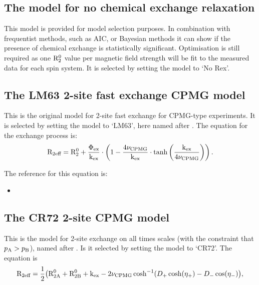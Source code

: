 
\subsection{The model for no chemical exchange relaxation}
\label{sect: dispersion: No Rex model}

This model is provided for model selection purposes.  In combination with frequentist methods, such as AIC, or Bayesian methods it can show if the presence of chemical exchange is statistically significant.  Optimisation is still required as one $\mathrm{R}_2^0$ value per magnetic field strength will be fit to the measured data for each spin system.  It is selected by setting the model to `No Rex'.




\subsection{The LM63 2-site fast exchange CPMG model}
\label{sect: dispersion: LM63 model}

This is the original model for 2-site fast exchange for CPMG-type experiments.  It is selected by setting the model to `LM63', here named after \citet{LuzMeiboom63}.  The equation for the exchange process is:
\begin{equation}
    \mathrm{R}_{2\textrm{eff}} = \mathrm{R}_2^0 + \frac{\Phi_\textrm{ex}}{\textrm{k}_\textrm{ex}} \cdot \left( 1 - \frac{4\nu_\textrm{CPMG}}{\textrm{k}_\textrm{ex}} \cdot \tanh \left( \frac{\textrm{k}_\textrm{ex}}{4\nu_\textrm{CPMG}} \right) \right) .
\end{equation}

The reference for this equation is:
\begin{itemize}
\item {}
\end{itemize}




\subsection{The CR72 2-site CPMG model}
\label{sect: dispersion: CR72 model}

This is the model for 2-site exchange on all times scales (with the constraint that $p_\textrm{A} > p_\textrm{B}$), named after \citet{CarverRichards72}.  Is it selected by setting the model to `CR72'.  The equation is
\begin{equation}
    \mathrm{R}_{2\textrm{eff}} = \frac{1}{2} \big( \textrm{R}_\textrm{2A}^0 + \textrm{R}_\textrm{2B}^0 + \textrm{k}_\textrm{ex} - 2\nu_\textrm{CPMG}\cosh^{-1} (D_+\cosh(\eta_+) - D_-\cos(\eta_-) \big) ,
\end{equation}

